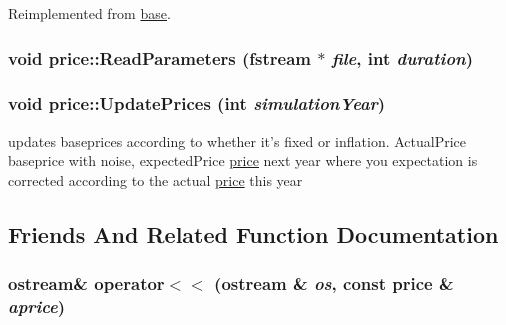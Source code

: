 Reimplemented from \hyperlink{classbase_ad2f5f5c9ec517641f63e52646cf49ad9}{base}.\hypertarget{classprice_a279b89717aee067acf170b8e7f858d42}{
\subsubsection[{ReadParameters}]{\setlength{\rightskip}{0pt plus 5cm}void price::ReadParameters (fstream $\ast$ {\em file}, \/  int {\em duration})}}
\label{classprice_a279b89717aee067acf170b8e7f858d42}
\hypertarget{classprice_a1599203e7ec6ad2dd1f8c0ee185e2d38}{
\subsubsection[{UpdatePrices}]{\setlength{\rightskip}{0pt plus 5cm}void price::UpdatePrices (int {\em simulationYear})}}
\label{classprice_a1599203e7ec6ad2dd1f8c0ee185e2d38}
updates baseprices according to whether it's fixed or inflation. ActualPrice baseprice with noise, expectedPrice \hyperlink{classprice}{price} next year where you expectation is corrected according to the actual \hyperlink{classprice}{price} this year 

\subsection{Friends And Related Function Documentation}
\hypertarget{classprice_ac7c80f9b2cbaaff0824af0e37f65ce86}{
\subsubsection[{operator$<$$<$}]{\setlength{\rightskip}{0pt plus 5cm}ostream\& operator$<$$<$ (ostream \& {\em os}, \/  const {\bf price} \& {\em aprice})}}
\label{classprice_ac7c80f9b2cbaaff0824af0e37f65ce86}


